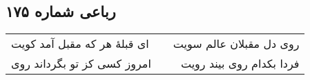 \begin{center}
\section*{رباعی شماره ۱۷۵}
\label{sec:sh175}
\begin{longtable}{l p{0.5cm} r}
ای قبلهٔ هر که مقبل آمد کویت
&&
روی دل مقبلان عالم سویت
\\
امروز کسی کز تو بگرداند روی
&&
فردا بکدام روی بیند رویت
\\
\end{longtable}
\end{center}
